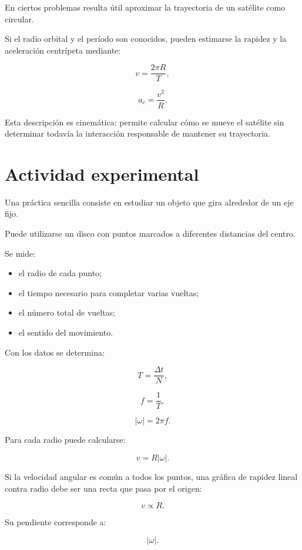 \begin{aplicacion}

En ciertos problemas resulta útil aproximar la trayectoria de un satélite como
circular.

Si el radio orbital y el período son conocidos, pueden estimarse la rapidez y
la aceleración centrípeta mediante:

\[
v=\frac{2\pi R}{T},
\]

\[
a_c=\frac{v^2}{R}.
\]

Esta descripción es cinemática: permite calcular cómo se mueve el satélite sin
determinar todavía la interacción responsable de mantener su trayectoria.

\end{aplicacion}


\section{Actividad experimental}

Una práctica sencilla consiste en estudiar un objeto que gira alrededor de un
eje fijo.

Puede utilizarse un disco con puntos marcados a diferentes distancias del
centro.

Se mide:

\begin{itemize}
    \item el radio de cada punto;
    \item el tiempo necesario para completar varias vueltas;
    \item el número total de vueltas;
    \item el sentido del movimiento.
\end{itemize}

Con los datos se determina:

\[
T=\frac{\Delta t}{N},
\]

\[
f=\frac{1}{T},
\]

\[
|\omega|=2\pi f.
\]

Para cada radio puede calcularse:

\[
v=R|\omega|.
\]

Si la velocidad angular es común a todos los puntos, una gráfica de rapidez
lineal contra radio debe ser una recta que pasa por el origen:

\[
v\propto R.
\]

Su pendiente corresponde a:

\[
|\omega|.
\]

